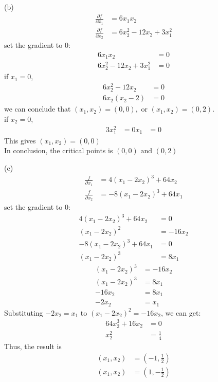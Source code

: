 \documentclass[a4paper,12pt]{article}
\begin{document}
(b) 
\begin{align*}
    \frac{\partial f}{\partial x_1} &= 6x_1x_2 \\
    \frac{\partial f}{\partial x_2} &= 6x_2^2 - 12x_2 + 3x_1^2 
\end{align*}
set the gradient to 0:
\begin{align*}
    6x_1x_2 &= 0 \\
    6x_2^2 - 12x_2 + 3x_1^2 &= 0
\end{align*}
if \(x_1 = 0\), 
\begin{align*}
    6x_2^2 - 12x_2 &= 0 \\
    6x_2(x_2 - 2) &= 0
\end{align*}
we can conclude that \((x_1 ,x_2) = (0, 0), \text{ or } (x_1 ,x_2) = (0, 2).\) \\
if \(x_2 = 0\), 
\begin{align*}
    3x_1^2 &= 0
    x_1 &= 0
\end{align*}
This gives \((x_1, x_2) = (0, 0)\) \\
In conclusion, the critical points is \((0, 0) \text{ and }(0, 2)\)

(c)
\begin{align*}
    \frac{f}{\partial x_1} &= 4(x_1 - 2x_2)^3 + 64x_2 \\
    \frac{f}{\partial x_2} &= -8(x_1 - 2x_2)^3 + 64x_1
\end{align*}
set the gradient to 0:
\begin{align*}
    4(x_1 - 2x_2)^3 + 64x_2 &= 0 \\
    (x_1 - 2x_2)^2 &= -16x_2 \\
    -8(x_1 - 2x_2)^3 + 64x_1 &= 0 \\
    (x_1 - 2x_2)^3 &= 8x_1
\end{align*}
\begin{align*} 
    (x_1 - 2x_2)^3 &= -16x_2 \\
    (x_1 - 2x_2)^3 &= 8x_1 \\
    -16x_2 &= 8x_1 \\
    -2x_2 &= x_1
\end{align*}
Substituting \(-2x_2 = x_1 \) to \((x_1 - 2x_2)^2 = -16x_2\), we can get:
\begin{align*}
    64x_2^3 + 16x_2 &= 0 \\
    x_2^2 &= \frac{1}{4} 
\end{align*}
Thus, the result is
\begin{align*}
    (x_1, x_2) &= (-1, \frac{1}{2}) \\
    (x_1, x_2) &= (1, -\frac{1}{2})
\end{align*}
\end{document}
